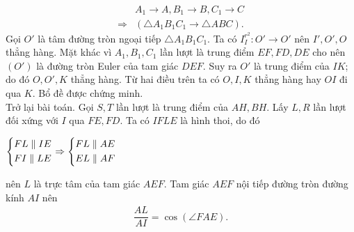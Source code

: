 \begin{bt}
{		{\allowdisplaybreaks
		\begin{align*}
			&A_1\longrightarrow A,B_1\longrightarrow B,C_1\longrightarrow C\\
		\Rightarrow& \left(\triangle A_1B_1C_1\longrightarrow\triangle ABC \right).
		\end{align*}}Gọi $O'$ là tâm đường tròn ngoại tiếp $\triangle A_1B_1C_1.$ Ta có $I_I^{r^2}:O'\longrightarrow O'$ nên $I',O',O$ thẳng hàng.
		Mặt khác vì $A_1,B_1,C_1$ lần lượt là trung điểm $EF,FD,DE$ cho nên $(O')$ là đường tròn Euler của tam giác $DEF$. Suy ra $O'$ là trung điểm của $IK$; do đó $O,O',K$ thẳng hàng.
		Từ hai điều trên ta có $O,I,K$ thẳng hàng hay $OI$ đi qua $K$. Bổ đề được chứng minh.\\
		Trở lại bài toán. Gọi $S,T$ lần lượt là trung điểm của $AH,BH$. Lấy $L,R$ lần lượt đối xứng với $I$ qua $FE,FD$. Ta có $IFLE$ là hình thoi, do đó
		\begin{center}
			$\left\{\begin{aligned}&FL\parallel IE\\& FI\parallel LE\end{aligned}\right.\Rightarrow\left\{\begin{aligned}&FL\parallel AE\\&EL\parallel AF\end{aligned}\right.$
		\end{center}
		nên $L$ là trực tâm của tam giác $AEF$. Tam giác $AEF$ nội tiếp đường tròn đường kính $AI$ nên
		\begin{align*}
			\dfrac{AL}{AI}=\cos(\angle FAE). \tag{2}
		\end{align*}
		\begin{center}
\end{center}}
\end{bt}
